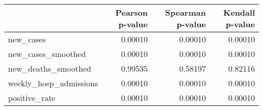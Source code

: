 \begin{tabular}{lrrr}
\toprule
{} &  Pearson p-value &  Spearman p-value &  Kendall p-value \\
\midrule
new\_cases              &          0.00010 &           0.00010 &          0.00010 \\
new\_cases\_smoothed     &          0.00010 &           0.00010 &          0.00010 \\
new\_deaths\_smoothed    &          0.99535 &           0.58197 &          0.82116 \\
weekly\_hosp\_admissions &          0.00010 &           0.00010 &          0.00010 \\
positive\_rate          &          0.00010 &           0.00010 &          0.00010 \\
\bottomrule
\end{tabular}
